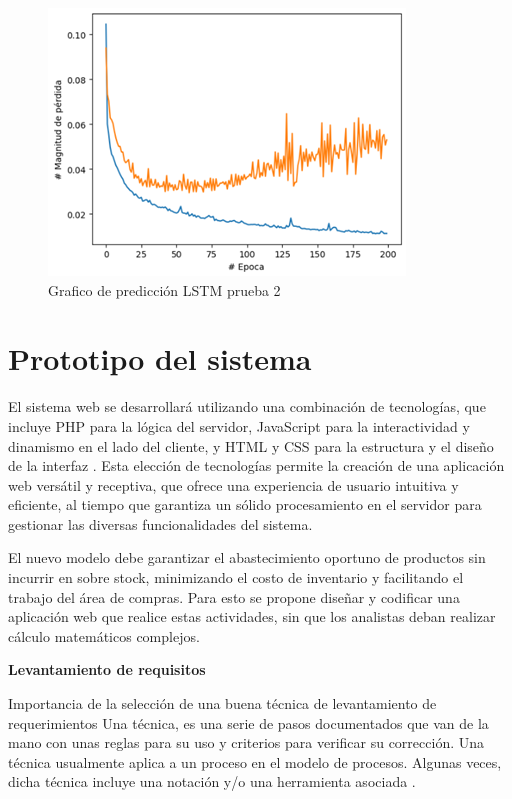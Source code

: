 \begin{figure}[H]
  \begin{center}
    \includegraphics[scale=0.80]{./Imagenlstm2.png}
    \caption{Grafico de predicción LSTM prueba 2}
    \label{fig:res2}
  \end{center}
\end{figure}

\section{Prototipo del sistema}

El sistema web se desarrollará utilizando una combinación de tecnologías, que incluye PHP para la lógica del servidor, JavaScript para la interactividad y dinamismo en el lado del cliente, y HTML y CSS para la estructura y el diseño de la interfaz \cite{nixon2014learning}. Esta elección de tecnologías permite la creación de una aplicación web versátil y receptiva, que ofrece una experiencia de usuario intuitiva y eficiente, al tiempo que garantiza un sólido procesamiento en el servidor para gestionar las diversas funcionalidades del sistema.

\vspace{1\baselineskip}
El nuevo modelo debe garantizar el abastecimiento oportuno de productos sin
incurrir en sobre stock, minimizando el costo de inventario y facilitando el trabajo del área de compras. Para esto se propone diseñar y codificar una aplicación web que realice estas actividades, sin que los analistas deban realizar cálculo matemáticos complejos.


\vspace{1\baselineskip}
\textbf{Levantamiento de requisitos}

Importancia de la selección de una buena técnica de levantamiento de requerimientos 
Una técnica, es una serie de pasos documentados que van de la mano con unas reglas para su uso y criterios para verificar su corrección. Una técnica usualmente aplica a un proceso en el
modelo de procesos. Algunas veces, dicha técnica incluye una notación y/o una herramienta asociada \cite{mejia2009tecnicas}.

